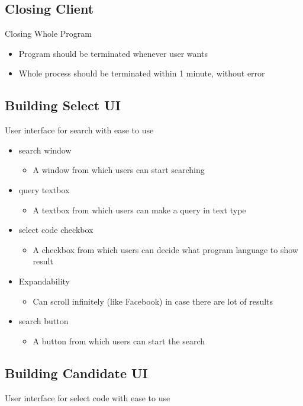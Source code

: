 \documentclass[conference]{IEEEtran}
\begin{document}
\subsection{Closing Client}
 Closing Whole Program 

\begin{itemize}
  \item Program should be terminated whenever user wants
  \item Whole process should be terminated within 1 minute, without error
\end{itemize}
\textit{ }


\subsection{Building Select UI}
 User interface for search with ease to use

\begin{itemize}
  \item search window
  \begin{itemize}
    \item A window from which users can start searching
  \end{itemize}
  \item query textbox
  \begin{itemize}
    \item A textbox from which users can make a query in text type
  \end{itemize}
  \item select code checkbox
  \begin{itemize}
    \item A checkbox from which users can decide what program language to show result
  \end{itemize}
  \item Expandability   \begin{itemize}
    \item Can scroll infinitely (like Facebook) in case there are lot of results
  \end{itemize}
  \item search button   \begin{itemize}
    \item A button from which users can start the search
  \end{itemize}
\end{itemize}
\textit{ }


\subsection{Building Candidate UI}
 User interface for select code with ease to use
\end{document}
